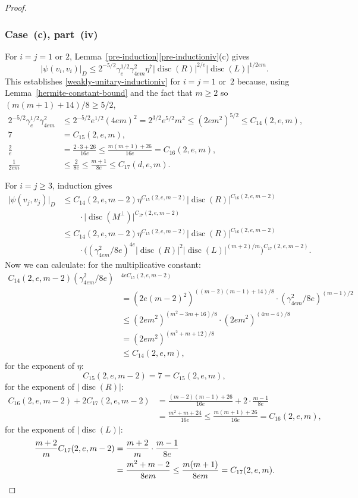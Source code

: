\documentclass[11pt]{article}
\numberwithin{equation}{section}
\DeclareMathOperator{\disc}{disc}
\newcommand{\abs}[1]{\lvert #1 \rvert}
\begin{document}
\begin{proof}
\subsubsection*{Case~(c), part~(iv)}
For $i=j=1$ or $2$, Lemma~\ref{pre-induction}\eqref{pre-inductioniv}(c) gives
\begin{equation} \label{eqn:case-c-iv-base}
\abs{\psi(v_i, v_i)}_D \leq 2^{-5/2} \gamma_e^{1/2} \gamma_{4em}^2 \eta^7 \abs{\disc(R)}^{2/e} \abs{\disc(L)}^{1/2em}.
\end{equation}
This establishes \eqref{weakly-unitary-inductioniv} for $i=j=1$ or~$2$ because, using Lemma~\ref{hermite-constant-bound} and the fact that $m \geq 2$ so $(m(m+1)+14)/8 \geq 5/2$,
\begin{align*}
2^{-5/2} \gamma_e^{1/2} \gamma_{4em}^2
& \leq 2^{-5/2} e^{1/2} (4em)^2
= 2^{3/2} e^{5/2} m^2
\leq (2em^2)^{5/2}
\leq C_{14}(2,e,m),
\\[3pt]
7 & = C_{15}(2,e,m),
\\ \frac{2}{e} & = \frac{2 \cdot 3 + 26}{16e} \leq \frac{m(m+1) + 26}{16e} = C_{16}(2,e,m),
\\ \frac{1}{2em} & \leq \frac{2}{8e} \leq \frac{m+1}{8e} \leq C_{17}(d,e,m).
\end{align*}

For $i=j \geq 3$, induction gives
\begin{align*}
\abs{\psi(v_j, v_j)}_D
& \leq C_{14}(2,e,m-2) \eta^{C_{15}(2,e,m-2)} \abs{\disc(R)}^{C_{16}(2,e,m-2)}
\\& \qquad \cdot \abs{\disc(M^\perp)}^{C_{17}(2,e,m-2)}
\\& \leq C_{14}(2,e,m-2) \eta^{C_{15}(2,e,m-2)} \abs{\disc(R)}^{C_{16}(2,e,m-2)}
\\& \qquad \cdot \bigl( (\gamma_{4em}^2/8e)^{4e} \abs{\disc(R)}^2 \abs{\disc(L)}^{(m+2)/m} \bigr)^{C_{17}(2,e,m-2)}.
\end{align*}
Now we can calculate:
for the multiplicative constant:
\begin{align*}
C_{14}(2,e,m-2) (\gamma_{4em}^2/8e)&^{4eC_{17}(2,e,m-2)}
\\& = (2e(m-2)^2)^{((m-2)(m-1)+14)/8} \cdot (\gamma_{4em}^2/8e)^{(m-1)/2}
\\& \leq (2em^2)^{(m^2-3m+16)/8} \cdot (2em^2)^{(4m-4)/8}
\\& = (2em^2)^{(m^2+m+12)/8}
\\& \leq C_{14}(2,e,m),
\end{align*}
for the exponent of $\eta$:
\[
C_{15}(2,e,m-2) = 7 = C_{15}(2,e,m),
\]
for the exponent of $\abs{\disc(R)}$:
\begin{align*}
C_{16}(2,e,m-2) + 2C_{17}(2,e,m-2)
& = \frac{(m-2)(m-1)+26}{16e} + 2 \cdot \frac{m-1}{8e}
\\& = \frac{m^2+m+24}{16e}
\!\leq\! \frac{m(m+1)+26}{16e}
= C_{16}(2,e,m),
\end{align*}
for the exponent of $\abs{\disc(L)}$:
\begin{align*}
\frac{m+2}{m} C_{17}(2,e,m-2)
& = \frac{m+2}{m} \cdot \frac{m-1}{8e}
\\& = \frac{m^2+m-2}{8em}
\leq \frac{m(m+1)}{8em}
= C_{17}(2,e,m).
\qedhere
\end{align*}
\end{proof}
\end{document}
